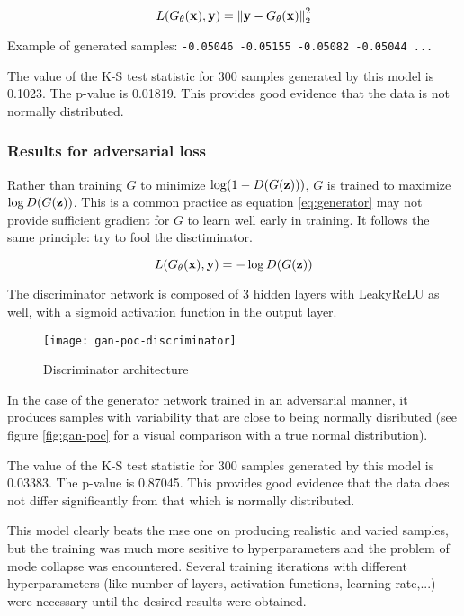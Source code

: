 \documentclass[../main.tex]{subfiles}
\begin{document}
\begin{equation}\label{eq:mse}
L(G_{\theta}(\mathbf{x}), \mathbf{y}) =
\left\| \mathbf{y} - G_{\theta}(\mathbf{x}) \right\|_2^2
\end{equation}

Example of generated samples:
\verb|-0.05046 -0.05155 -0.05082 -0.05044 ...|

The value of the K-S test statistic for 300 samples generated by this model is 0.1023.
The p-value is 0.01819. This provides good evidence that the data is not
normally distributed.

\subsubsection{Results for adversarial loss}
Rather than training $G$ to minimize $\log (1 - D(G(\mathbf{z})))$,
$G$ is trained to maximize $\log D(G(\mathbf{z}))$.
This is a common practice as equation
\eqref{eq:generator} may not provide sufficient gradient for $G$ to learn well
early in training. It follows the same principle: try to fool the disctiminator.

\begin{equation}
L(G_{\theta}(\mathbf{x}), \mathbf{y}) = - \log D(G(\mathbf{z}))
\end{equation}

The discriminator network is composed of 3 hidden layers with LeakyReLU as well,
with a sigmoid activation function in the output layer.

\begin{figure}[h]
\centering
\texttt{[image: gan-poc-discriminator]}
\caption{Discriminator architecture}
\label{fig:gan-poc-discriminator}
\end{figure}

In the case of the generator network trained in an adversarial manner,
it produces samples with variability that are close to being normally disributed
(see figure \ref{fig:gan-poc} for a visual comparison with a true normal
distribution).

The value of the K-S test statistic for 300 samples generated by this model is 0.03383.
The p-value is 0.87045. This provides good evidence that the data does
not differ significantly from that which is normally distributed.

This model clearly beats the \gls{mse} one on producing realistic and varied
samples, but the training was much more sesitive to hyperparameters
and the problem of mode collapse was encountered.
Several training iterations with different
hyperparameters (like number of layers, activation functions, learning rate,...)
were necessary until the desired results were obtained.
\end{document}
